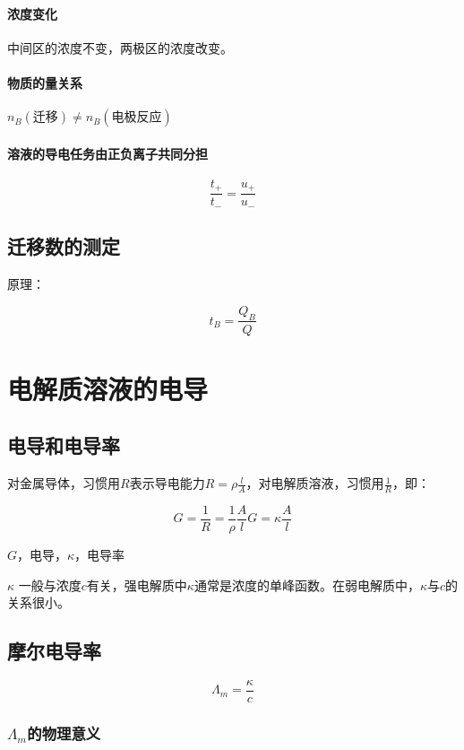     \paragraph{浓度变化} 中间区的浓度不变，两极区的浓度改变。
    \paragraph{物质的量关系} $n_B(\mbox{迁移}) \neq n_B(\mbox{电极反应})$
    \paragraph{溶液的导电任务由正负离子共同分担}
    \[
        \frac{t_{+}}{t_{-}} = \frac{u_{+}}{u_{-}}  
    \]

    \subsection{迁移数的测定}

    原理：

    \[
        t_B = \frac{Q_B}{Q}  
    \]
    \section{电解质溶液的电导}

    \subsection{电导和电导率}

    对金属导体，习惯用$R$表示导电能力$R = \rho \frac{l}{A}$，对电解质溶液，习惯用$\frac{1}{R}$，即：
    
    \[
        G = \frac{1}{R} = \frac{1}{\rho}\frac{A}{l} G = \kappa \frac{A}{l}  
    \]

    $G$，电导，$\kappa$，电导率

    $\kappa$ 一般与浓度$c$有关，强电解质中$\kappa$通常是浓度的单峰函数。在弱电解质中，$\kappa$与$c$的关系很小。

    \subsection{摩尔电导率}

    \begin{definition}
        \[
            \varLambda_m = \frac{\kappa}{c} 
        \]
    \end{definition}

    \subsubsection{$\varLambda_m$的物理意义}

